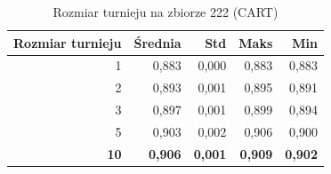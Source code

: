 \begin{table}[htbp]
\centering
\small
\setlength{\tabcolsep}{6pt}
\renewcommand{\arraystretch}{1.2}
\caption{Rozmiar turnieju na zbiorze 222 (CART)}
\label{tab:CART_tournament_size_222}
\begin{tabular}{r|r|r|r|r}
\toprule
Rozmiar turnieju & Średnia & Std & Maks & Min \\
\hline
1 & 0,883 & 0,000 & 0,883 & 0,883 \\
2 & 0,893 & 0,001 & 0,895 & 0,891 \\
3 & 0,897 & 0,001 & 0,899 & 0,894 \\
5 & 0,903 & 0,002 & 0,906 & 0,900 \\
\textbf{10} & \textbf{0,906} & \textbf{0,001} & \textbf{0,909} & \textbf{0,902} \\
\bottomrule
\end{tabular}
\end{table}